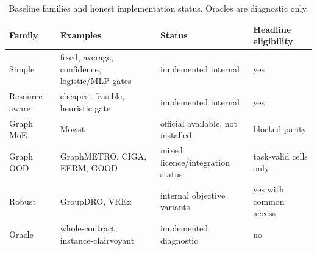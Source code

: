 \begin{table}[t]
\centering
\caption{Baseline families and honest implementation status. Oracles are diagnostic only.}
\label{tab:baselines}
\small
\begin{tabularx}{\textwidth}{l>{\raggedright\arraybackslash}X>{\raggedright\arraybackslash}X>{\raggedright\arraybackslash}X}
\toprule
Family & Examples & Status & Headline eligibility \\
\midrule
Simple & fixed, average, confidence, logistic/MLP gates & implemented internal & yes \\
Resource-aware & cheapest feasible, heuristic gate & implemented internal & yes \\
Graph MoE & Mowst & official available, not installed & blocked parity \\
Graph OOD & GraphMETRO, CIGA, EERM, GOOD & mixed licence/integration status & task-valid cells only \\
Robust & GroupDRO, VREx & internal objective variants & yes with common access \\
Oracle & whole-contract, instance-clairvoyant & implemented diagnostic & no \\
\bottomrule
\end{tabularx}
\end{table}
